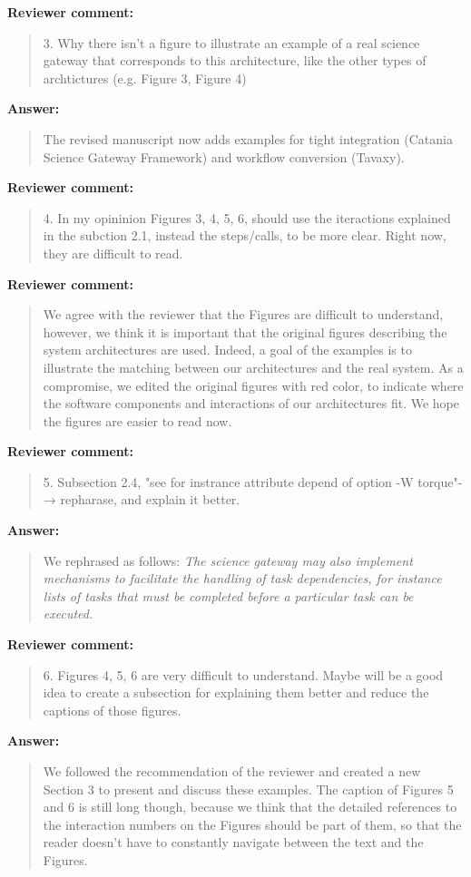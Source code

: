 \documentclass[a4]{article}
\newenvironment{review}%
{\textbf{Reviewer comment:}\begin{quote}}%
{\end{quote}}%
\newenvironment{answer}%
{\textbf{Answer:}\begin{small}\begin{quote}}%
{\end{quote}\end{small}}%
\begin{document}
\begin{review}
  3. Why there isn't a figure to illustrate an example of a real
  science gateway that corresponds to this architecture, like the
  other types of archtictures (e.g. Figure 3, Figure 4)
\end{review}

\begin{answer}
  The revised manuscript now adds examples for tight integration
  (Catania Science Gateway Framework) and workflow conversion
  (Tavaxy).
\end{answer}

\begin{review}
  4. In my opininion Figures 3, 4, 5, 6, should use the iteractions
  explained in the subction 2.1, instead the steps/calls, to be more
  clear. Right now, they are difficult to read.
\end{review}

\begin{review}
  We agree with the reviewer that the Figures are difficult to
  understand, however, we think it is important that the original
  figures describing the system architectures are used. Indeed, a goal
  of the examples is to illustrate the matching between our
  architectures and the real system. As a compromise, we edited the
  original figures with red color, to indicate where the software
  components and interactions of our architectures fit. We hope the
  figures are easier to read now.
\end{review}

\begin{review}
  5.  Subsection 2.4, "see for instrance attribute depend of option -W
  torque"-→ repharase, and explain it better.
\end{review}

\begin{answer}
We rephrased as follows:
\emph{The science gateway may also implement mechanisms to facilitate the handling of task
dependencies, for instance lists of tasks that must
be completed before a particular task can be executed.}
\end{answer}

\begin{review}
6.  Figures 4, 5, 6 are very difficult to understand. Maybe will be a
good idea to create a subsection for explaining them better and reduce
the captions of those figures.
\end{review}

\begin{answer}
  We followed the recommendation of the reviewer and created a new
  Section 3 to present and discuss these examples. The caption of
  Figures 5 and 6 is still long though, because we think that the
  detailed references to the interaction numbers on the Figures should
  be part of them, so that the reader doesn't have to constantly
  navigate between the text and the Figures.
\end{answer}
\end{document}
